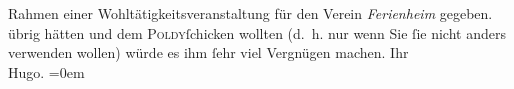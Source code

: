 \begin{ledgroupsized}[t]{13cm}
{{{                        Rahmen einer Wohltätigkeitsveranstaltung für den Verein \emph{Ferienheim} gegeben.}}}\label{K_L00762_1h} übrig hätten und dem \textsc{Poldy}ſchicken wollten (d. h. nur wenn Sie ſie nicht anders verwenden wollen)
                    würde es ihm ſehr viel Vergnügen machen.\pend
           \pstart
           Ihr{\\[\baselineskip]}\spacefill\mbox{Hugo.}\pend
           \leftskip=0em{}
         
         \endnumbering{}\end{ledgroupsized}  \newcommand{\dateiname}{L00762}\newcommand{\titel}{Hugo von Hofmannsthal an Arthur Schnitzler, 14. 1. 1898}\newcommand{\editorInnen}{Martin Anton Müller und Gerd-Hermann Susen}
      